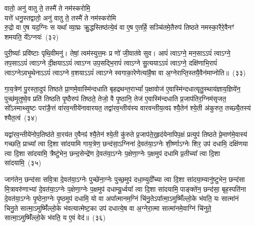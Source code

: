 वातो॒ अनु॑ वातु ते॒ तस्मै॑ ते  नम॑स्करोमि॒\\यत्ते॑  धनु॒स्तद्वातो॒ अनु॑ वातु ते॒ तस्मै॑ ते  नम॑स्करोमि\\रु॒द्रो वा ए॒ष यद॒ग्निः स यथा᳚ व्या॒घ्रः क्रु॒द्धस्तिष्ठ॑त्ये॒वं वा ए॒ष ए॒तर्\mbox{}हि॒ सञ्चि॑तमे॒तैरुप॑ तिष्ठते नमस्का॒रैरे॒वैनꣳ॑ शमयति॒ ये᳚\-ऽग्नयः॑~(३२)\ip

पुरी॒ष्याः᳚ प्रवि॑ष्टाः पृथि॒वीमनु॑। तेषां॒ त्वम॑स्युत्त॒मः प्र णो॑ जी॒वात॑वे सुव। आपं॑ त्वा\-ऽग्ने॒ मन॒सा\-ऽऽपं॑ त्वा\-ऽग्ने॒ तप॒सा\-ऽऽपं॑ त्वा\-ऽग्ने दी॒क्षया\-ऽऽपं॑ त्वा\-ऽग्न उप॒सद्भि॒रापं॑ त्वाऽग्ने सु॒त्यया\-ऽऽपं॑ त्वा\-ऽग्ने॒ दक्षि॑णाभि॒रापं॑ त्वाऽग्ने\-ऽवभृ॒थेना\-ऽऽपं॑ त्वाऽग्ने व॒शया\-ऽऽपं॑ त्वाऽग्ने स्वगाका॒रेणेत्या॑है॒षा वा अ॒ग्नेराप्ति॒स्तयै॒वैन॑माप्नोति॥~(३३)\ip

{\anuvakamend[{ऐ॒न्द्रि॒या पु॒र उ॑त्त॒राद्धनु॒स्तद॒ग्नय॑ आहा॒ष्टौ च॑}]}

गा॒य॒त्रेण॑ पु॒रस्ता॒दुप॑ तिष्ठते प्रा॒णमे॒वास्मि॑न्दधाति बृहद्रथन्त॒रा\-भ्यां᳚ प॒क्षावोज॑ ए॒वास्मि॑न्दधात्यृतु॒स्थाय॑ज्ञाय॒ज्ञिये॑न॒ पुच्छ॑मृ॒तुष्वे॒व प्रति॑ तिष्ठति पृ॒ष्ठैरुप॑ तिष्ठते॒ तेजो॒ वै पृ॒ष्ठानि॒ तेज॑ ए॒वास्मि॑न्दधाति प्र॒जा\-प॑तिर॒ग्निम॑सृजत॒ सो᳚\-ऽस्माथ्सृ॒ष्टः परा॑ङै॒त्तं वा॑र\-व॒न्ती\-ये॑ना\-वारयत॒ तद्वा॑रव॒न्तीय॑स्य वारवन्तीय॒त्वꣴ श्यै॒तेन॑ श्ये॒ती अ॑कुरुत॒ तच्छ्यै॒तस्य॑ श्यैत॒त्वं~(३४)\ip

यद्वा॑रव॒न्तीये॑नोप॒तिष्ठ॑ते वा॒रय॑त ए॒वैनꣴ॑ श्यै॒तेन॑ श्ये॒ती कु॑रुते प्र॒जा\-प॑ते॒र्॒\mbox{}हृद॑येनापिप॒क्षं प्रत्युप॑ तिष्ठते प्रे॒माण॑मे॒वास्य॑ गच्छति॒ प्राच्या᳚ त्वा दि॒शा सा॑दयामि गाय॒त्रेण॒ छन्द॑सा॒\-ऽग्निना॑ दे॒वत॑या॒\-ऽग्नेः शी॒र्ष्णा\-ऽग्नेः शिर॒ उप॑ दधामि॒ दक्षि॑णया त्वा दि॒शा सा॑दयामि॒ त्रैष्टु॑भेन॒ छन्द॒सेन्द्रे॑ण दे॒वत॑या॒\-ऽग्नेः प॒क्षेणा॒ग्नेः प॒क्षमुप॑ दधामि प्र॒तीच्या᳚ त्वा दि॒शा सा॑दयामि॒~(३५)\ip

जाग॑तेन॒ छन्द॑सा सवि॒त्रा दे॒वत॑या॒\-ऽग्नेः पुच्छे॑ना॒ग्नेः पुच्छ॒मुप॑ दधा॒म्युदी᳚च्या त्वा दि॒शा सा॑दया॒म्यानु॑ष्टुभेन॒ छन्द॑सा मि॒त्रावरु॑णाभ्यां दे॒वत॑या॒\-ऽग्नेः प॒क्षेणा॒ग्नेः प॒क्षमुप॑ दधाम्यू॒र्ध्वया᳚ त्वा दि॒शा सा॑दयामि॒ पाङ्क्ते॑न॒ छन्द॑सा॒ बृह॒स्पति॑ना दे॒वत॑या॒\-ऽग्नेः पृ॒ष्ठेना॒ग्नेः पृ॒ष्ठमुप॑ दधामि॒ यो वा अपा᳚त्मानम॒ग्निं चि॑नु॒ते\-ऽपा᳚त्मा॒\-ऽमुष्मिँ॑ल्लो॒के भ॑वति॒ यः सात्मा॑नं चिनु॒ते सात्मा॒\-ऽमुष्मिँ॑ल्लो॒के भ॑वत्यात्मेष्ट॒का उप॑ दधात्ये॒ष वा अ॒ग्नेरा॒त्मा सात्मा॑नमे॒वाग्निं चि॑नुते॒ सात्मा॒\-ऽमुष्मिँ॑ल्लो॒के भ॑वति॒ य ए॒वं वेद॑॥~(३६)\ip

{\anuvakamend[{श्यै॒त॒त्वं प्र॒तीच्या᳚ त्वा दि॒शा सा॑दयामि॒ यः सात्मा॑नं चिनु॒ते द्वाविꣳ॑शतिश्च}]}

